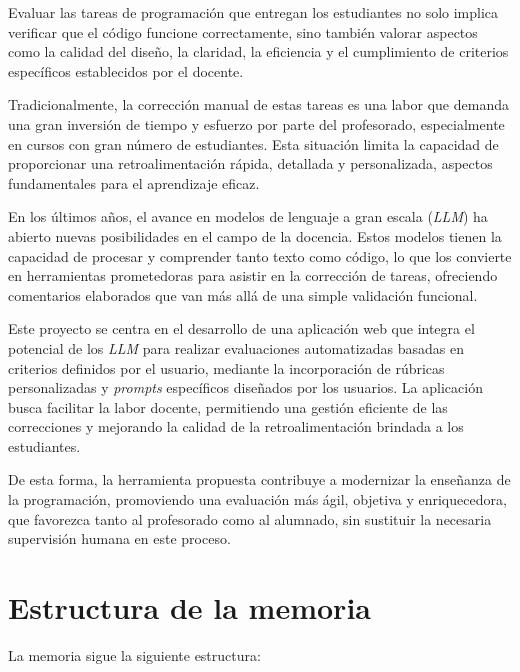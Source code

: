
Evaluar las tareas de programación que entregan los estudiantes no solo implica verificar que el código funcione correctamente, sino también valorar aspectos como la calidad del diseño, la claridad, la eficiencia y el cumplimiento de criterios específicos establecidos por el docente.

Tradicionalmente, la corrección manual de estas tareas es una labor que demanda una gran inversión de tiempo y esfuerzo por parte del profesorado, especialmente en cursos con gran número de estudiantes. Esta situación limita la capacidad de proporcionar una retroalimentación rápida, detallada y personalizada, aspectos fundamentales para el aprendizaje eficaz.

En los últimos años, el avance en modelos de lenguaje a gran escala (\textit{LLM}) ha abierto nuevas posibilidades en el campo de la docencia. Estos modelos tienen la capacidad de procesar y comprender tanto texto como código, lo que los convierte en herramientas prometedoras para asistir en la corrección de tareas, ofreciendo comentarios elaborados que van más allá de una simple validación funcional.

Este proyecto se centra en el desarrollo de una aplicación web que integra el potencial de los \textit{LLM} para realizar evaluaciones automatizadas basadas en criterios definidos por el usuario, mediante la incorporación de rúbricas personalizadas y \textit{prompts} específicos diseñados por los usuarios. La aplicación busca facilitar la labor docente, permitiendo una gestión eficiente de las correcciones y mejorando la calidad de la retroalimentación brindada a los estudiantes.

De esta forma, la herramienta propuesta contribuye a modernizar la enseñanza de la programación, promoviendo una evaluación más ágil, objetiva y enriquecedora, que favorezca tanto al profesorado como al alumnado, sin sustituir la necesaria supervisión humana en este proceso.

\section{Estructura de la memoria}

La memoria sigue la siguiente estructura:

